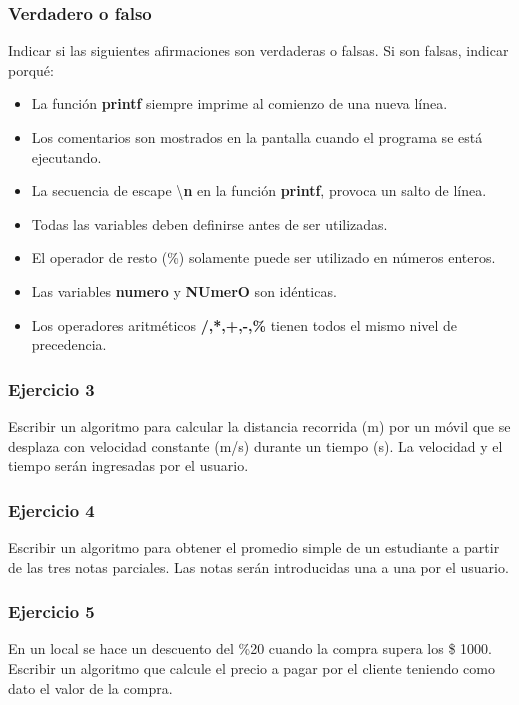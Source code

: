 \subsubsection{Verdadero o falso}
Indicar si las siguientes afirmaciones son verdaderas o falsas. Si son falsas, indicar porqué:
\begin{itemize}
  \item La función \textbf{printf} siempre imprime al comienzo de una nueva línea.
  \item Los comentarios son mostrados en la pantalla cuando el programa se está ejecutando.
  \item La secuencia de escape \textbackslash \textbf{n} en la función \textbf{printf}, provoca un salto de línea.
  \item Todas las variables deben definirse antes de ser utilizadas.
  \item El operador de resto (\%) solamente puede ser utilizado en números enteros.
  \item Las variables \textbf{numero} y \textbf{NUmerO} son idénticas.
  \item Los operadores aritméticos \textbf{/,*,+,-,\%} tienen todos el mismo nivel de precedencia.
\end{itemize}

\subsubsection{Ejercicio 3}
Escribir un algoritmo para calcular la distancia recorrida (m) por un móvil que se desplaza con velocidad constante (m/s) durante un tiempo (s). 
La velocidad y el tiempo serán ingresadas por el usuario.

\subsubsection{Ejercicio 4}
Escribir un algoritmo para obtener el promedio simple de un estudiante a partir de las tres notas parciales.
Las notas serán introducidas una a una por el usuario.

\subsubsection{Ejercicio 5}
En un local se hace un descuento del \%20 cuando la compra supera los \$ 1000. Escribir un algoritmo que calcule el precio a pagar por el cliente
teniendo como dato el valor de la compra.

